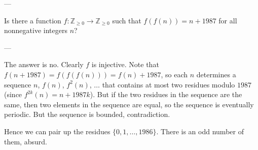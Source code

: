 
---

Is there a function $f:\mathbb Z_{\ge0}\to\mathbb Z_{\ge0}$ such that $f(f(n))=n+1987$ for all nonnegative integers $n$?

---

The answer is no. Clearly $f$ is injective. Note that $f(n+1987)=f(f(f(n)))=f(n)+1987$, so each $n$ determines a sequence $n$, $f(n)$, $f^2(n)$, $\ldots$ that contains at most two residues modulo $1987$ (since $f^{2k}(n)=n+1987k$). But if the two residues in the sequence are the same, then two elements in the sequence are equal, so the sequence is eventually periodic. But the sequence is bounded, contradiction.

Hence we can pair up the residues $\{0,1,\ldots,1986\}$. There is an odd number of them, absurd.

